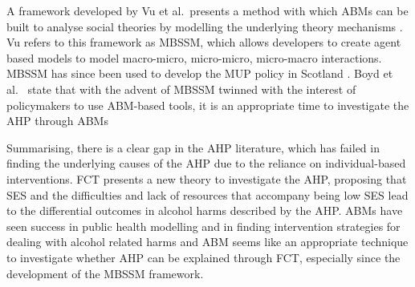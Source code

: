 A framework developed by Vu et al.~presents a method with which \ac{ABM}s can be built to analyse social theories by modelling the underlying theory mechanisms \cite{MBSSM}. Vu refers to this framework as \ac{MBSSM}, which allows developers to create agent based models to model macro-micro, micro-micro, micro-macro interactions. \ac{MBSSM} has since been used to develop the \ac{MUP} policy in Scotland \cite{mbssmCommentary, scotlandMUP}. Boyd et al.~ state that with the advent of \ac{MBSSM} twinned with the interest of policymakers to use \ac{ABM}-based tools, it is an appropriate time to investigate the \ac{AHP} through \ac{ABM}s \cite{Boyd2022, sipherIntro}

Summarising, there is a clear gap in the \ac{AHP} literature, which has failed in finding the underlying causes of the \ac{AHP} due to the reliance on individual-based interventions. \ac{FCT} presents a new theory to investigate the \ac{AHP},  proposing that \ac{SES} and the difficulties and lack of resources that accompany being low \ac{SES} lead to the differential outcomes in alcohol harms described by the \ac{AHP}. \ac{ABM}s have seen success in public health modelling and in finding intervention strategies for dealing with alcohol related harms and \ac{ABM} seems like an appropriate technique to investigate whether \ac{AHP} can be explained through \ac{FCT}, especially since the development of the \ac{MBSSM} framework. 


